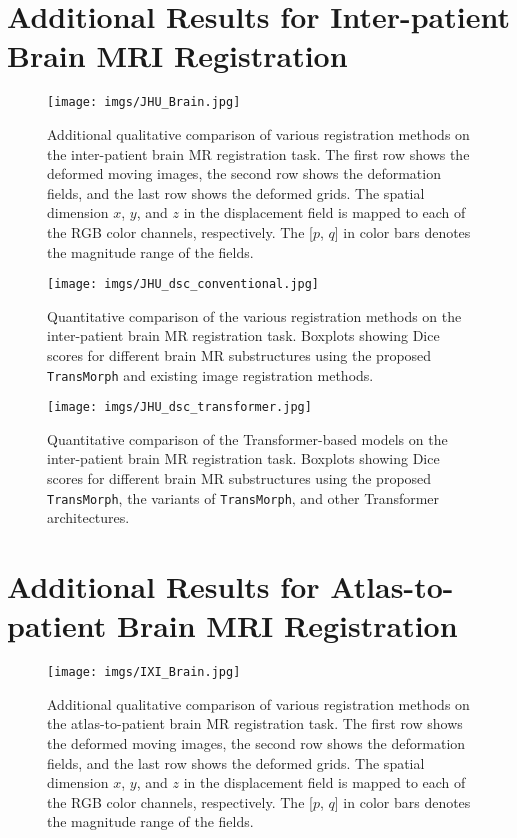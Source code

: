 \documentclass[times,twocolumn,final]{elsarticle}
\begin{document}
\section{Additional Results for Inter-patient Brain MRI Registration}
\label{sec:add_inter_MR}
\begin{figure*}[!htp]
\centering
\texttt{[image: imgs/JHU\_Brain.jpg]}
\caption{Additional qualitative comparison of various registration methods on the inter-patient brain MR registration task. The first row shows the deformed moving images, the second row shows the deformation fields, and the last row shows the deformed grids. The spatial dimension $x$, $y$, and $z$ in the displacement field is mapped to each of the RGB color channels, respectively. The [$p$, $q$] in color bars denotes the magnitude range of the fields.\label{fig:jhu_brain}}
\end{figure*}

\begin{figure*}[!htp]
\centering
\texttt{[image: imgs/JHU\_dsc\_conventional.jpg]}
\caption{Quantitative comparison of the various registration methods on the inter-patient brain MR registration task. Boxplots showing Dice scores for different brain MR substructures using the proposed \texttt{TransMorph} and existing image registration methods. \label{fig:jhu_brain_conventional}}
\end{figure*}

\begin{figure*}[!htp]
\centering
\texttt{[image: imgs/JHU\_dsc\_transformer.jpg]}
\caption{Quantitative comparison of the Transformer-based models on the inter-patient brain MR registration task. Boxplots showing Dice scores for different brain MR substructures using the proposed \texttt{TransMorph}, the variants of \texttt{TransMorph}, and other Transformer architectures.\label{fig:jhu_brain_transformer}}
\end{figure*}

\newpage
\section{Additional Results for Atlas-to-patient Brain MRI Registration}
\label{sec:add_atlas_MR}
\begin{figure*}[!htp]
\centering
\texttt{[image: imgs/IXI\_Brain.jpg]}
\caption{Additional qualitative comparison of various registration methods on the atlas-to-patient brain MR registration task. The first row shows the deformed moving images, the second row shows the deformation fields, and the last row shows the deformed grids. The spatial dimension $x$, $y$, and $z$ in the displacement field is mapped to each of the RGB color channels, respectively. The [$p$, $q$] in color bars denotes the magnitude range of the fields.\label{fig:IXI_brain}}
\end{figure*}
\end{document}
